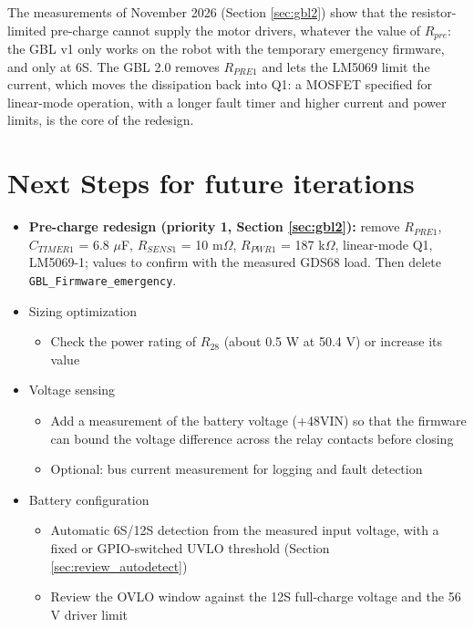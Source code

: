 \documentclass[11pt,a4paper]{article}
\begin{document}
The measurements of November 2026 (Section \ref{sec:gbl2}) show that the resistor-limited pre-charge cannot supply the motor drivers, whatever the value of $R_{pre}$: the GBL v1 only works on the robot with the temporary emergency firmware, and only at 6S. The GBL 2.0 removes $R_{PRE1}$ and lets the LM5069 limit the current, which moves the dissipation back into Q1: a MOSFET specified for linear-mode operation, with a longer fault timer and higher current and power limits, is the core of the redesign.

\section{Next Steps for future iterations}
\label{sec:next_step}

\begin{itemize}
    \item \textbf{Pre-charge redesign (priority 1, Section \ref{sec:gbl2}):} remove $R_{PRE1}$, $C_{TIMER1}$ = 6.8 $\mu$F, $R_{SENS1}$ = 10 m$\Omega$, $R_{PWR1}$ = 187 k$\Omega$, linear-mode Q1, LM5069-1; values to confirm with the measured GDS68 load. Then delete \texttt{GBL\_Firmware\_emergency}.
    \item Sizing optimization
        \begin{itemize}
            \item Check the power rating of $R_{28}$ (about 0.5 W at 50.4 V) or increase its value
        \end{itemize}
    \item Voltage sensing
        \begin{itemize}
            \item Add a measurement of the battery voltage (+48VIN) so that the firmware can bound the voltage difference across the relay contacts before closing
            \item Optional: bus current measurement for logging and fault detection
        \end{itemize}
    \item Battery configuration
        \begin{itemize}
            \item Automatic 6S/12S detection from the measured input voltage, with a fixed or GPIO-switched UVLO threshold (Section \ref{sec:review_autodetect})
            \item Review the OVLO window against the 12S full-charge voltage and the 56 V driver limit
        \end{itemize}

\end{itemize}
\end{document}
